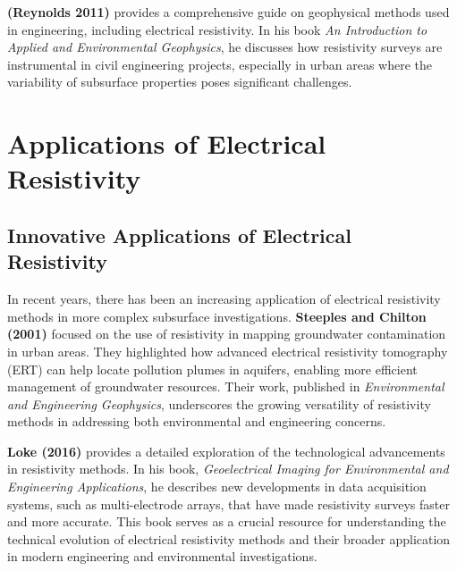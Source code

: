 \documentclass[12pt,a4paper]{report}
\begin{document}
\textbf{(Reynolds 2011)} provides a comprehensive guide on geophysical methods used in engineering, including electrical resistivity. In his book \textit{An Introduction to Applied and Environmental Geophysics}, he discusses how resistivity surveys are instrumental in civil engineering projects, especially in urban areas where the variability of subsurface properties poses significant challenges.
\section{Applications of Electrical Resistivity}

\subsection{Innovative Applications of Electrical Resistivity}
In recent years, there has been an increasing application of electrical resistivity methods in more complex subsurface investigations. \textbf{Steeples and Chilton (2001)} focused on the use of resistivity in mapping groundwater contamination in urban areas. They highlighted how advanced electrical resistivity tomography (ERT) can help locate pollution plumes in aquifers, enabling more efficient management of groundwater resources. Their work, published in \textit{Environmental and Engineering Geophysics}, underscores the growing versatility of resistivity methods in addressing both environmental and engineering concerns.

\textbf{Loke (2016)} provides a detailed exploration of the technological advancements in resistivity methods. In his book, \textit{Geoelectrical Imaging for Environmental and Engineering Applications}, he describes new developments in data acquisition systems, such as multi-electrode arrays, that have made resistivity surveys faster and more accurate. This book serves as a crucial resource for understanding the technical evolution of electrical resistivity methods and their broader application in modern engineering and environmental investigations.
\end{document}
